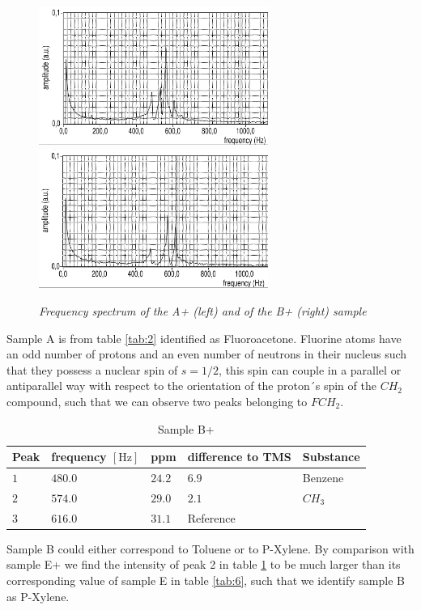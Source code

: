 \begin{figure}[h]
	\centering
	\includegraphics[width=75mm]{A+}
	\includegraphics[width=75mm]{B+}
	\caption{\itshape Frequency spectrum of the A+ (left) and of the B+ (right) sample}
	\label{fig:6}
\end{figure}
\noindent
Sample A is from table \ref{tab:2} identified as Fluoroacetone. Fluorine atoms have an odd number of protons and an even number of neutrons in their nucleus such that they possess a nuclear spin of $s=1/2$, this spin can couple in a parallel or antiparallel way with respect to the orientation of the proton´s spin of the $CH_2$ compound, such that we can observe two peaks belonging to $FCH_2$.\cite{Fluorine}



\begin{table}[h]
	\centering
	\begin{tabular}{lllll}
		\toprule
		Peak & frequency $\left[\mathrm{Hz}\right]$ & ppm & difference to TMS & Substance \\
		\midrule
		$ 1$ & $480.0$ & $24.2$ & $6.9$ & Benzene\\
		
		$ 2$ & $574.0$ & $29.0$ &$ 2.1$ & $CH_3$\\
		
		$ 3$ & $616.0$ &$31.1$ & Reference & \\
		\bottomrule
	\end{tabular}
	\caption{Sample B+}
	\label{tab:3}
\end{table}
\noindent
Sample B could either correspond to Toluene or to P-Xylene. By comparison with sample E+ we find the intensity of peak 2 in table \ref{tab:3} to be much larger than its corresponding value of sample E in table \ref{tab:6}, such that we identify sample B as P-Xylene.


